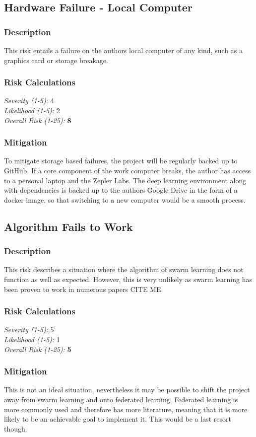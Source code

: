 \subsection{Hardware Failure - Local Computer}
\subsubsection{Description}
This risk entails a failure on the authors local computer of any kind, such as a graphics card or storage breakage.

\subsubsection{Risk Calculations}
\emph{Severity (1-5):} 4 \\
\emph{Likelihood (1-5):} 2 \\
\emph{Overall Risk (1-25):} \textbf{8}

\subsubsection{Mitigation}
To mitigate storage based failures, the project will be regularly backed up to GitHub. If a core component of the work computer breaks, the author has access to a personal laptop and the Zepler Labs. The deep learning environment along with dependencies is backed up to the authors Google Drive in the form of a docker image, so that switching to a new computer would be a smooth process.

\subsection{Algorithm Fails to Work}
\subsubsection{Description}
This risk describes a situation where the algorithm of swarm learning does not function as well as expected. However, this is very unlikely as swarm learning has been proven to work in numerous papers CITE ME.

\subsubsection{Risk Calculations}
\emph{Severity (1-5):} 5 \\
\emph{Likelihood (1-5):} 1 \\
\emph{Overall Risk (1-25):} \textbf{5}

\subsubsection{Mitigation}
This is not an ideal situation, nevertheless it may be possible to shift the project away from swarm learning and onto federated learning. Federated learning is more commonly used and therefore has more literature, meaning that it is more likely to be an achievable goal to implement it. This would be a last resort though.
